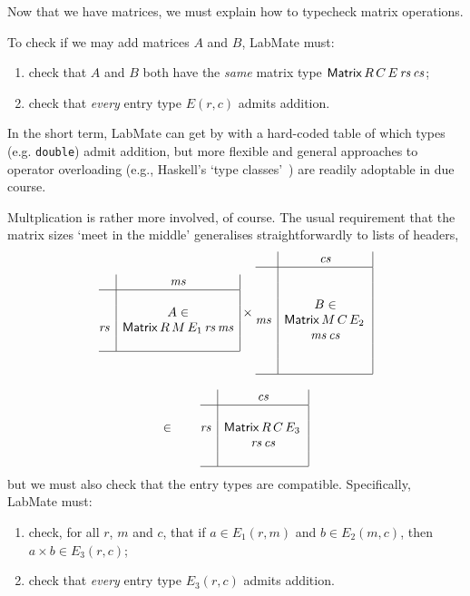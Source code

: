 \documentclass{IMEKO2024}
\newcommand{\Matrix}[5]{\mathsf{Matrix}\,#1\,#2\,#3\,#4\,#5}
\newcommand{\remph}{\emph}
\begin{document}
Now that we have matrices, we must explain how to typecheck matrix operations.

To check if we may add matrices $A$ and $B$, LabMate must:
\begin{enumerate}
\item check that $A$ and $B$ both have the \remph{same} matrix type $\Matrix{R}{C}{E}{\rs}{\cs}$;
\item check that \remph{every} entry type $E(r,c)$ admits addition.
\end{enumerate}
In the short term, LabMate can get by with a hard-coded table of which types (e.g. \texttt{double}) admit addition, but more flexible and general approaches to operator overloading (e.g., Haskell's `type classes'~\cite{wadler.blott}) are readily adoptable in due course.

Multplication is rather more involved, of course. The usual requirement that the matrix sizes `meet in the middle' generalises straightforwardly to lists of headers,
\[\begin{array}{@{}c@{}}
\begin{array}[c]{@{}r|c|}
  \;  & \ms \\
  \hline
  \;  &     \\
  \;  &  A \in \\
  \rs & \Matrix{R}{M}{E_1}{\rs}{\ms} \\
  \;  & \\
  \hline
\end{array}
  \times
\begin{array}[c]{@{}r|c|}
  \;  & \cs \\
  \hline
  \;  &     \\
  \;  &     \\
  \;  &  B \in \\
  \ms & \Matrix{M}{C}{E_2}{\\ & \ms}{\cs} \\
  \;  &     \\
  \;  & \\
  \hline
\end{array}
\bigskip\\
\in \qquad
\begin{array}[c]{@{}r|c|}
  \;  & \cs \\
  \hline
  \;  &     \\
  \rs & \Matrix{R}{C}{E_3}{\\ & \rs}{\cs} \\
  \;  & \\
  \hline
\end{array}
\end{array}
\]
but we must also check that the entry types are compatible. Specifically, LabMate must:
\begin{enumerate}
  \item check, for all $r$, $m$ and $c$, that if $a\in E_1(r,m)$ and $b\in E_2(m,c)$, then
    $a\times b \in E_3(r,c)$;
  \item check that \remph{every} entry type $E_3(r,c)$ admits addition.
\end{enumerate}
\end{document}
